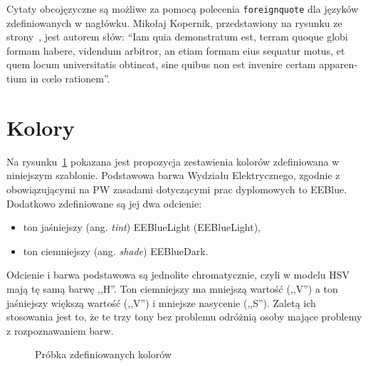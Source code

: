 Cytaty obcojęzyczne są możliwe za pomocą polecenia \texttt{foreignquote} dla języków zdefiniowanych w nagłówku. Mikołaj Kopernik, przedstawiony na rysunku ze strony~\pageref{rys:kopernik}, jest autorem słów: \foreignquote{latin}{Iam quia demonstratum est, terram quoque globi formam habere, videndum arbitror, an etiam formam eius sequatur motus, et quem locum universitatis obtineat, sine quibus non est invenire certam apparentium in cœlo rationem}.

\section{Kolory}
Na rysunku~\ref{rys:colorsample} pokazana jest propozycja zestawienia kolorów zdefiniowana w niniejszym szablonie. Podstawowa barwa Wydziału Elektrycznego, zgodnie z obowiązującymi na PW zasadami dotyczącymi prac dyplomowych to \textcolor{EEBlue}{EEBlue}. Dodatkowo zdefiniowane są jej dwa odcienie:
\begin{itemize}
    \item ton jaśniejszy (ang. \textit{tint}) \textcolor{EEBlueLight}{EEBlueLight} (EEBlueLight),
    \item ton ciemniejszy (ang. \textit{shade}) \textcolor{EEBlueDark}{EEBlueDark}.
\end{itemize}
Odcienie i barwa podstawowa są jednolite chromatycznie, czyli w modelu HSV mają tę samą barwę ,,H''. Ton ciemniejszy ma mniejszą wartość (,,V'') a ton jaśniejszy większą wartość (,,V'') i mniejsze nasycenie (,,S''). Zaletą ich stosowania jest to, że te trzy tony bez problemu odróżnią osoby mające problemy z rozpoznawaniem barw. 

\begin{figure}[!ht]
    \centering
    \caption{Próbka zdefiniowanych kolorów}
    \label{rys:colorsample}
\end{figure}

